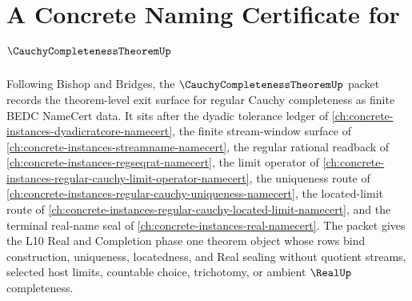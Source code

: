 \chapter{A Concrete Naming Certificate for $\CauchyCompletenessTheoremUp$}
\label{ch:concrete-instances-cauchy-completeness-theorem-namecert}

Following Bishop and Bridges, the $\CauchyCompletenessTheoremUp$ packet records the theorem-level exit surface for regular Cauchy completeness as finite BEDC NameCert data. It sits after the dyadic tolerance ledger of \autoref{ch:concrete-instances-dyadicratcore-namecert}, the finite stream-window surface of \autoref{ch:concrete-instances-streamname-namecert}, the regular rational readback of \autoref{ch:concrete-instances-regseqrat-namecert}, the limit operator of \autoref{ch:concrete-instances-regular-cauchy-limit-operator-namecert}, the uniqueness route of \autoref{ch:concrete-instances-regular-cauchy-uniqueness-namecert}, the located-limit route of \autoref{ch:concrete-instances-regular-cauchy-located-limit-namecert}, and the terminal real-name seal of \autoref{ch:concrete-instances-real-namecert}. The packet gives the L10 Real and Completion phase one theorem object whose rows bind construction, uniqueness, locatedness, and Real sealing without quotient streams, selected host limits, countable choice, trichotomy, or ambient $\RealUp$ completeness.


